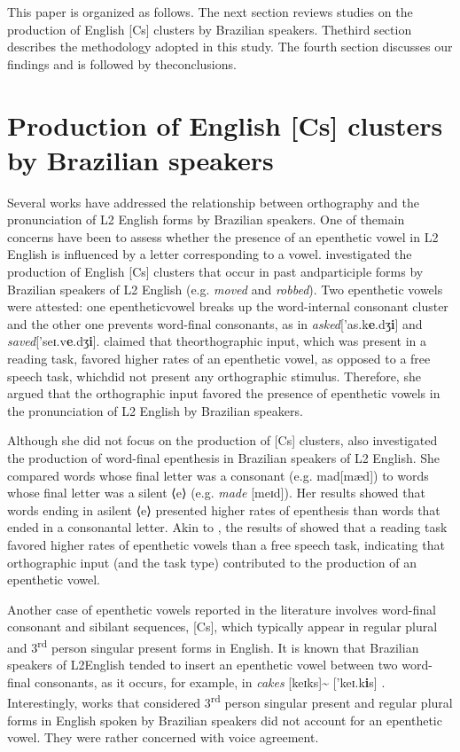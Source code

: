 This paper is organized as follows. The next section reviews studies on
the production of English {[}Cs{]} clusters by Brazilian speakers. Thethird
section describes the methodology adopted in this study. The
fourth section discusses our findings and is followed by theconclusions.



\section{Production of English {[}Cs{]} clusters by Brazilian speakers}
Several works have addressed the relationship between orthography and
the pronunciation of L2 English forms by Brazilian speakers. One of themain
concerns have been to assess whether the presence of an epenthetic
vowel in L2 English is influenced by a letter corresponding to a
vowel. \citet{delatorre2006} investigated the
production of English {[}Cs{]} clusters that occur in past andparticiple forms
by Brazilian speakers of L2 English (e.g. \emph{moved}
and \emph{robbed}). Two epenthetic vowels were attested: one epentheticvowel
breaks up the word-internal consonant cluster and the other one
prevents word-final consonants, as in
\emph{asked}{[}'as.k\textbf{e}.dʒ\textbf{i}{]} and
\emph{saved}{[}'seɪ.v\textbf{e}.dʒ\textbf{i}{]}. \citet{delatorre2006} claimed that
theorthographic input, which was present in a reading task, favored higher
rates of an epenthetic vowel, as opposed to a free speech task, whichdid not
present any orthographic stimulus. Therefore, she argued that
the orthographic input favored the presence of epenthetic vowels in
the pronunciation of L2 English by Brazilian speakers.

Although she did not focus on the
production of {[}Cs{]} clusters, \citet{silveira2007} also investigated
the production of word-final epenthesis in Brazilian speakers of L2 English.
She compared words whose final letter was a consonant (e.g. mad{[}mæd{]}) to
words whose final letter was a silent ⟨e⟩ (e.g.
\emph{made} {[}meɪd{]}). Her results showed that words ending in asilent ⟨e⟩
presented higher rates of epenthesis than words that ended in
a consonantal letter. Akin to \citet{delatorre2006}, the results of \citet{silveira2007}
showed that a reading task favored higher rates of epenthetic
vowels than a free speech task, indicating that orthographic input (and the task
type) contributed to the production of an epenthetic vowel.

Another case of epenthetic vowels reported in the literature involves
word-final consonant and sibilant sequences, {[}Cs{]}, which typically appear in
regular plural and 3\textsuperscript{rd} person singular
present forms in English. It is known that Brazilian speakers of L2English
tended to insert an epenthetic vowel between two word-final
consonants, as it occurs, for example, in \emph{cakes}
{[}keɪks{]}\textasciitilde{} {[}'keɪ.k\textbf{i}s{]} \citep{silva2012}.
Interestingly, works that considered 3\textsuperscript{rd} person singular
present and regular plural forms in English spoken by Brazilian
speakers did not account for an epenthetic vowel. They were rather concerned
with voice agreement.

